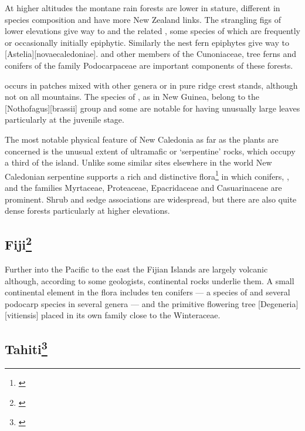 At higher altitudes the montane rain forests are lower in stature, different in species composition and have more New Zealand links.
The strangling figs of lower elevations give way to  and the related , some species of which are frequently or occasionally initially epiphytic.
Similarly the nest fern epiphytes give way to [Astelia][novaecaledoniae].  and other members of the Cunoniaceae, tree ferns and conifers of the family Podocarpaceae are important components of these forests.

 occurs in patches mixed with other genera or in pure ridge crest stands, although not on all mountains.
The species of , as in New Guinea, belong to the [Nothofagus][brassii] group and some are notable for having unusually large leaves particularly at the juvenile stage.

The most notable physical feature of New Caledonia as far as the plants are concerned is the unusual extent of ultramafic or `serpentine' rocks, which occupy a third of the island.
Unlike some similar sites elsewhere in the world New Caledonian serpentine supports a rich and distinctive flora\footnote{\cite{moratph1986affinites}} in which conifers, , and the families Myrtaceae, Proteaceae, Epacridaceae and Casuarinaceae are prominent.
Shrub and sedge associations are widespread, but there are also quite dense forests particularly at higher elevations.

\subsection[Fiji]{Fiji\footnote{\cite{carlquist1965island}}}

Further into the Pacific to the east the Fijian Islands are largely volcanic although, according to some geologists, continental rocks underlie them.
A small continental element in the flora includes ten conifers --- a species of  and several podocarp species in several genera --- and the primitive flowering tree [Degeneria][vitiensis] placed in its own family close to the Winteraceae.

\subsection[Tahiti]{Tahiti\footnote{\cite{carlquist1965island}}}

